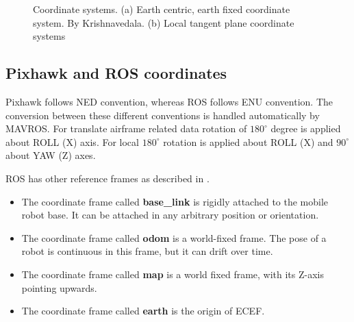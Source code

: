 \begin{figure}%
	\centering
	\caption[ECEF coordinate system]{\small Coordinate systems. (a) Earth centric, earth fixed coordinate system. By Krishnavedala. (b) Local tangent plane coordinate systems
	}%
	\label{fig:coordinatesystem}%
\end{figure}

\subsection{Pixhawk and ROS coordinates}

Pixhawk follows NED convention, whereas ROS follows ENU convention. The conversion between these different conventions is handled automatically by MAVROS. For translate airframe related data rotation of $180^{\circ}$ degree is applied about ROLL (X) axis. For local $180^{\circ}$ rotation is applied about ROLL (X) and $90^{\circ}$ about YAW (Z) axes.

ROS has other reference frames as described in .

\begin{itemize}
	\item The coordinate frame called \textbf{base\_link} is rigidly attached to the mobile robot base. It can be attached in any arbitrary position or orientation.
	\item The coordinate frame called \textbf{odom} is a world-fixed frame. The pose of a robot is continuous in this frame, but it can drift over time.
	\item The coordinate frame called \textbf{map} is a world fixed frame, with its Z-axis pointing upwards. 
	\item The coordinate frame called \textbf{earth} is the origin of ECEF.
\end{itemize}


